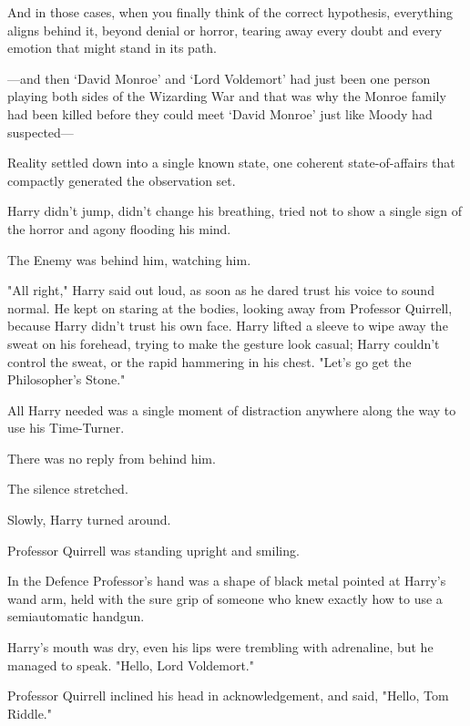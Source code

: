 And in those cases, when you finally think of the correct hypothesis,
everything aligns behind it, beyond denial or horror, tearing away every doubt
and every emotion that might stand in its path.

—and then `David Monroe' and `Lord Voldemort' had just been one person
playing both sides of the Wizarding War and that was why the Monroe family had
been killed before they could meet `David Monroe' just like Moody had
suspected—

Reality settled down into a single known state, one coherent state-of-affairs
that compactly generated the observation set.

Harry didn't jump, didn't change his breathing, tried not to show a single sign
of the horror and agony flooding his mind.

The Enemy was behind him, watching him.

"All right," Harry said out loud, as soon as he dared trust his voice to sound
normal. He kept on staring at the bodies, looking away from Professor Quirrell,
because Harry didn't trust his own face. Harry lifted a sleeve to wipe away the
sweat on his forehead, trying to make the gesture look casual; Harry couldn't
control the sweat, or the rapid hammering in his chest. "Let's go get the
Philosopher's Stone."

All Harry needed was a single moment of distraction anywhere along the way to
use his Time-Turner.

There was no reply from behind him.

The silence stretched.

Slowly, Harry turned around.

Professor Quirrell was standing upright and smiling.

In the Defence Professor's hand was a shape of black metal pointed at Harry's
wand arm, held with the sure grip of someone who knew exactly how to use a
semiautomatic handgun.

Harry's mouth was dry, even his lips were trembling with adrenaline, but he
managed to speak. "Hello, Lord Voldemort."

Professor Quirrell inclined his head in acknowledgement, and said, "Hello, Tom
Riddle."
